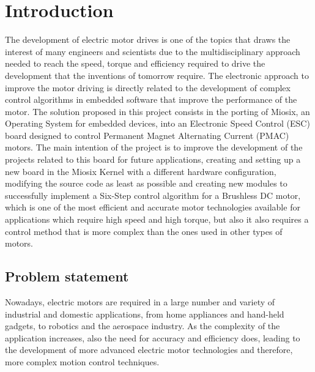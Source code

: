 %
%
%


\section{Introduction}
The development of electric motor drives is one of the topics that draws the interest of many engineers and scientists due to the multidisciplinary approach needed to reach the speed, torque and efficiency required to drive the development that the inventions of tomorrow require. The electronic approach to improve the motor driving is directly related to the development of complex control algorithms in embedded software that improve the performance of the motor. The solution proposed in this project consists in the porting of Miosix, an Operating System for embedded devices, into an Electronic Speed Control (ESC) board designed to control Permanent Magnet Alternating Current (PMAC) motors. The main intention of the project is to improve the development of the projects related to this board for future applications, creating and setting up a new board in the Miosix Kernel with a different hardware configuration, modifying the source code as least as possible and creating new modules to successfully implement a Six-Step control algorithm for a Brushless DC motor, which is one of the most efficient and accurate motor technologies available for applications which require high speed and high torque, but also it also requires a control method that is more complex than the ones used in other types of motors.

\subsection{Problem statement}
Nowadays, electric motors are required in a large number and variety of industrial and domestic applications, from home appliances and hand-held gadgets, to robotics and the aerospace industry. As the complexity of the application increases, also the need for accuracy and efficiency does, leading to the development of more advanced electric motor technologies and therefore, more complex motion control techniques.\\

